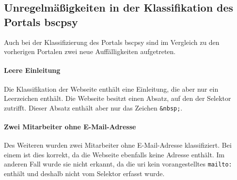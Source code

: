 \subsection{Unregelmäßigkeiten in der Klassifikation des Portals \acrshort{bscpsy}}
    Auch bei der Klassifizierung des Portals \gls{bscpsy}
    sind im Vergleich zu den vorherigen Portalen zwei neue
    Auffälligkeiten aufgetreten.

    \paragraph{Leere Einleitung}
        Die Klassifikation der Webseite enthält eine Einleitung,
        die aber nur ein Leerzeichen enthält.
        Die Webseite besitzt einen Absatz,
        auf den der Selektor zutrifft.
        Dieser Absatz enthält aber nur das Zeichen \texttt{\&nbsp;}.

    \paragraph{Zwei Mitarbeiter ohne E-Mail-Adresse}
        Des Weiteren wurden zwei Mitarbeiter ohne E-Mail-Adresse klassifiziert.
        Bei einem ist dies korrekt, da die Webseite ebenfalls keine Adresse enthält.
        Im anderen Fall wurde sie nicht erkannt,
        da die \gls{uri} kein vorangestelltes \texttt{mailto:} enthält
        und deshalb nicht vom Selektor erfasst wurde.
        